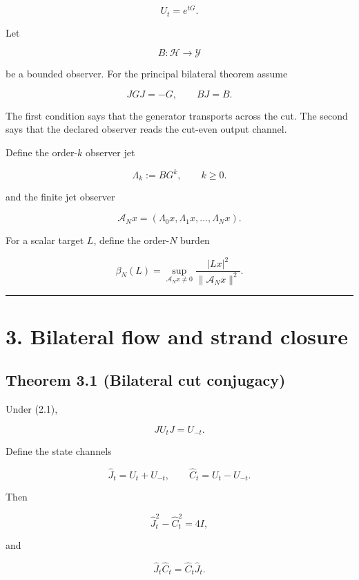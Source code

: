 \[
U_t=e^{tG}.
\]

Let

\[
B:\mathcal H\to\mathcal Y
\]

be a bounded observer. For the principal bilateral theorem assume

\[
JGJ=-G,
\qquad BJ=B.
\tag{2.1}
\]

The first condition says that the generator transports across the cut. The
second says that the declared observer reads the cut-even output channel.

Define the order-\(k\) observer jet

\[
\boxed{\Lambda_k:=BG^k,\qquad k\ge0.}
\tag{2.2}
\]

and the finite jet observer

\[
\boxed{
\mathcal A_Nx
=(\Lambda_0x,\Lambda_1x,\ldots,\Lambda_Nx).
}
\tag{2.3}
\]

For a scalar target \(L\), define the order-\(N\) burden

\[
\boxed{
\beta_N(L)
=
\sup_{\mathcal A_Nx\ne0}
\frac{|Lx|^2}{\|\mathcal A_Nx\|^2}.
}
\tag{2.4}
\]

\begin{center}\rule{0.5\linewidth}{0.5pt}\end{center}

\hypertarget{bilateral-flow-and-strand-closure}{%
\section{3. Bilateral flow and strand closure}\label{bilateral-flow-and-strand-closure}}

\hypertarget{theorem-3.1-bilateral-cut-conjugacy}{%
\subsection{Theorem 3.1 (Bilateral cut conjugacy)}\label{theorem-3.1-bilateral-cut-conjugacy}}

Under (2.1),

\[
\boxed{JU_tJ=U_{-t}.}
\tag{3.1}
\]

Define the state channels

\[
\widehat J_t=U_t+U_{-t},
\qquad
\widehat C_t=U_t-U_{-t}.
\tag{3.2}
\]

Then

\[
\boxed{\widehat J_t^2-\widehat C_t^2=4I,}
\tag{3.3}
\]

and

\[
\boxed{\widehat J_t\widehat C_t=\widehat C_t\widehat J_t.}
\tag{3.4}
\]


